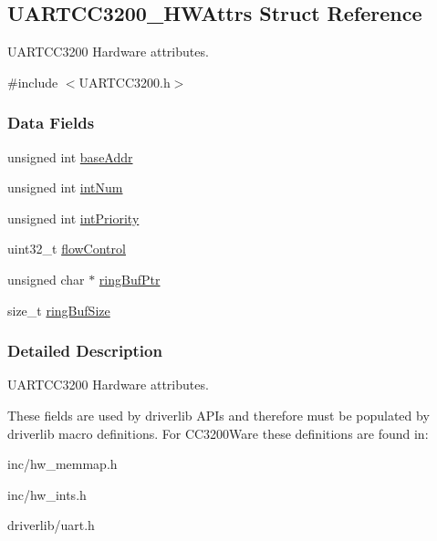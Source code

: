 \subsection{U\+A\+R\+T\+C\+C3200\+\_\+\+H\+W\+Attrs Struct Reference}
\label{struct_u_a_r_t_c_c3200___h_w_attrs}


U\+A\+R\+T\+C\+C3200 Hardware attributes.  




{\ttfamily \#include $<$U\+A\+R\+T\+C\+C3200.\+h$>$}

\subsubsection*{Data Fields}
\begin{DoxyCompactItemize}
\item 
unsigned int \hyperlink{struct_u_a_r_t_c_c3200___h_w_attrs_a559d6e21a7f9950e0d3e9d42413d47ea}{base\+Addr}
\item 
unsigned int \hyperlink{struct_u_a_r_t_c_c3200___h_w_attrs_a45e245f429f6bba9b77223bdcd58f2a2}{int\+Num}
\item 
unsigned int \hyperlink{struct_u_a_r_t_c_c3200___h_w_attrs_a4949d5f8d8f2e244ef949c6a3c0829c9}{int\+Priority}
\item 
uint32\+\_\+t \hyperlink{struct_u_a_r_t_c_c3200___h_w_attrs_abfe1406d34c1592bab7fb32f741943b3}{flow\+Control}
\item 
unsigned char $\ast$ \hyperlink{struct_u_a_r_t_c_c3200___h_w_attrs_aa6c7f90459e3145fdc3a2d94392911d6}{ring\+Buf\+Ptr}
\item 
size\+\_\+t \hyperlink{struct_u_a_r_t_c_c3200___h_w_attrs_a85b3df2ec52bcd2cef4a55efe823f978}{ring\+Buf\+Size}
\end{DoxyCompactItemize}


\subsubsection{Detailed Description}
U\+A\+R\+T\+C\+C3200 Hardware attributes. 

These fields are used by driverlib A\+P\+Is and therefore must be populated by driverlib macro definitions. For C\+C3200\+Ware these definitions are found in\+:
\begin{DoxyItemize}
\item inc/hw\+\_\+memmap.\+h
\item inc/hw\+\_\+ints.\+h
\item driverlib/uart.\+h
\end{DoxyItemize}

